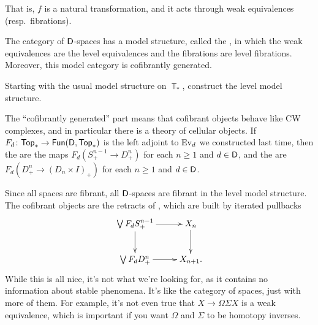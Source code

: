 That is, $f$ is a natural transformation, and it acts through weak equivalences (resp.\ fibrations).
\begin{thm}
The category of $\mathsf D$-spaces has a model structure, called the , in which the weak
equivalences are the level equivalences and the fibrations are level fibrations. Moreover, this model category is
cofibrantly generated.
\end{thm}
\begin{ex}
Starting with the usual model structure on $\Top_*$, construct the level model structure.
\end{ex}
The ``cofibrantly generated'' part means that cofibrant objects behave like CW complexes, and in particular there
is a theory of cellular objects. If $F_d\colon\mathsf{Top}_*\to\mathsf{Fun}(\mathsf D,\mathsf{Top}_*)$ is the left adjoint to $\operatorname{Ev}_d$ we
constructed last time, then the  are the maps $F_d(S_+^{n-1}\to D_+^n)$ for each
$n\ge 1$ and $d\in\mathsf D$, and the  are $F_d(D_+^n\to (D_n\times I)_+)$ for each $n\ge 1$
and $d\in\mathsf D$.

Since all spaces are fibrant, all $\mathsf D$-spaces are fibrant in the level model structure. The cofibrant objects are
the retracts of , which are built by iterated pullbacks
\[\xymatrix{
	\bigvee F_d S_+^{n-1}\ar[r]\ar[d] & X_n\ar[d]\\
	\bigvee F_dD_+^n\ar[r] & X_{n+1}.
}\]
While this is all nice, it's not what we're looking for, as it contains no information about stable phenomena. It's
like the category of spaces, just with more of them. For example, it's not even true that $X\to\Omega\Sigma X$ is a
weak equivalence, which is important if you want $\Omega$ and $\Sigma$ to be homotopy inverses.

